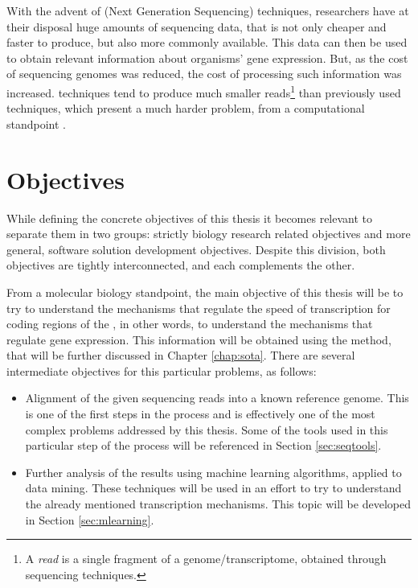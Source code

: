 With the advent of \ngs{} (Next Generation Sequencing) techniques, researchers
have at their disposal huge amounts of sequencing data, that is not only cheaper
and faster to produce, but also more commonly available. This data can then be
used to obtain relevant information about organisms' gene expression. But, as
the cost of sequencing genomes was reduced, the cost of processing such
information was increased. \ngs{} techniques tend to produce much smaller
reads\footnote{A \textit{read} is a single fragment of a genome/transcriptome,
obtained through sequencing techniques.} than previously used techniques, which
present a much harder problem, from a computational standpoint \cite{Wolf2013}.

\section{Objectives} \label{sec:goals}

While defining the concrete objectives of this thesis it becomes relevant to
separate them in two groups: strictly biology research related objectives and
more general, software solution development objectives. Despite this division,
both objectives are tightly interconnected, and each complements the other.

From a molecular biology standpoint, the main objective of this thesis will be
to try to understand the mechanisms that regulate the speed of transcription for
coding regions of the \dna, in other words, to understand the mechanisms that
regulate gene expression. This information will be obtained using the \rnaseq{}
method, that will be further discussed in Chapter \ref{chap:sota}. There are
several intermediate objectives for this particular problems, as follows:

\begin{itemize}

  \item
  Alignment of the given sequencing reads into a known reference genome. This is
  one of the first steps in the \rnaseq{} process and is effectively one of the
  most complex problems addressed by this thesis. Some of the tools used in this
  particular step of the process will be referenced in Section \ref{sec:seqtools}.

  \item
  Further analysis of the \rnaseq{} results using machine learning algorithms,
  applied to data mining. These techniques will be used in an effort to try to
  understand the already mentioned transcription mechanisms. This topic will be
  developed in Section \ref{sec:mlearning}.

\end{itemize}

